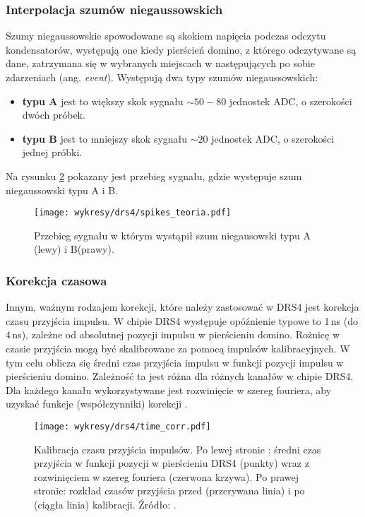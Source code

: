 \documentclass[a4paper,11pt,twoside]{article}
\begin{document}
\subsubsection{Interpolacja szumów niegaussowskich}
Szumy niegaussowskie spowodowane  są skokiem napięcia podczas odczytu kondensatorów, występują one kiedy pierścień domino, z którego odczytywane są dane, zatrzymana się w wybranych miejscach w następujących po sobie zdarzeniach (ang. \textsl{event}). Występują dwa typy szumów niegaussowskich:
\begin{itemize}
\item {\bf{typu A}} jest to większy skok sygnału $\sim 50 - 80$ jednostek ADC, o szerokości dwóch próbek.
\item {\bf{typu B}} jest to mniejszy skok sygnału $\sim 20$ jednostek ADC, o szerokości jednej próbki.
\end{itemize}
Na rysunku \ref{fig:spike_corr} pokazany jest przebieg sygnału, gdzie występuje szum niegaussowski typu A i B. 
\begin{figure}[H] 
\centering
\texttt{[image: wykresy/drs4/spikes\_teoria.pdf]}
\caption{Przebieg sygnału w którym wystąpił szum niegausowski typu A (lewy) i B(prawy).}
\label{fig:spike_corr}
\end{figure}
\subsubsection{Korekcja czasowa}
Innym, ważnym rodzajem korekcji, które należy zastosować w DRS4 jest korekcja czasu przyjścia impulsu. W chipie DRS4 występuje opóźnienie typowe to 1\,ns (do 4\,ns), zależne od absolutnej pozycji impulsu w pierścieniu domino. Rożnicę w czasie przyjścia mogą być skalibrowane za pomocą impulsów kalibracyjnych. W tym celu oblicza się średni czas przyjścia impulsu w funkcji pozycji impulsu w pierścieniu domino. Zależność ta jest różna dla różnych kanałów w chipie DRS4. Dla każdego kanału wykorzystywane jest rozwinięcie w szereg fouriera, aby uzyskać funkcje (współczynniki) korekcji \cite{drs4_magic}. 
\begin{figure}[H] 
\centering
\texttt{[image: wykresy/drs4/time\_corr.pdf]}
\caption{Kalibracja czasu przyjścia impulsów. Po lewej stronie : średni czas przyjścia w funkcji pozycji w pierścieniu DRS4 (punkty) wraz z rozwinięciem w szereg fouriera (czerwona krzywa). Po prawej stronie: rozkład czasów przyjścia przed (przerywana linia) i po (ciągła linia) kalibracji. Źródło: \cite{drs4_magic}. }
\label{fig:spike_corr}
\end{figure}
\end{document}
